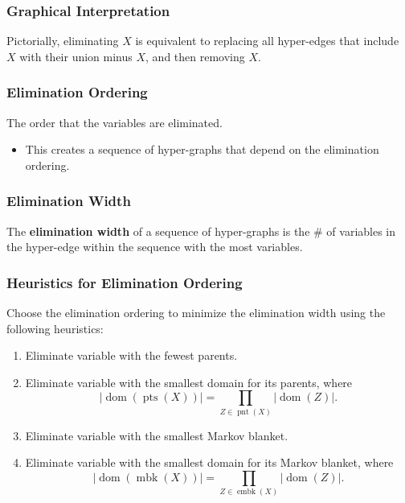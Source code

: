 \subsubsection{Graphical Interpretation}
\begin{notes}
    Pictorially, eliminating $X$ is equivalent to replacing all hyper-edges that include $X$ with their union minus $X$, and then removing $X$.
\end{notes}

\subsubsection{Elimination Ordering}
\begin{definition}
    The order that the variables are eliminated.
    \begin{itemize}
        \item This creates a sequence of hyper-graphs that depend on the elimination ordering.
    \end{itemize}
\end{definition}

\subsubsection{Elimination Width}
\begin{definition}
    The \textbf{elimination width} of a sequence of hyper-graphs is the \# of variables in the hyper-edge within the sequence with the most variables.
\end{definition}

\subsubsection{Heuristics for Elimination Ordering}
\begin{definition}
    Choose the elimination ordering to minimize the elimination width using the following heuristics:
    \begin{enumerate}
        \item Eliminate variable with the fewest parents.
        \item Eliminate variable with the smallest domain for its parents, where
        \[
        |\operatorname{dom}(\operatorname{pts}(X))| = \prod_{Z \in \operatorname{pnt}(X)} |\operatorname{dom}(Z)|.
        \]
        \item Eliminate variable with the smallest Markov blanket.
        \item Eliminate variable with the smallest domain for its Markov blanket, where
        \[
        |\operatorname{dom}(\operatorname{mbk}(X))| = \prod_{Z \in \operatorname{embk}(X)} |\operatorname{dom}(Z)|.
        \]
    \end{enumerate}
\end{definition}

